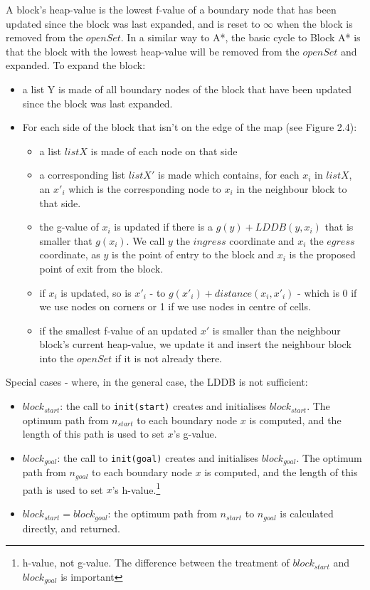 \documentclass[12pt,twoside,notitlepage]{report}
\begin{document}
\noindent
A block's heap-value is the lowest f-value of a boundary node that has been updated since the block was last expanded, and is reset to {$\infty$} when the block is removed from the {$openSet$}. In a similar way to A*, the basic cycle to Block A* is that the block with the lowest heap-value will be removed from the {$openSet$} and expanded. To expand the block:
\begin{itemize}
\item a list Y is made of all boundary nodes of the block that have been updated since the block was last expanded. 
\item For each side of the block that isn't on the edge of the map (see Figure 2.4):
  \begin{itemize}
  \item a list {$listX$} is made of each node on that side
  \item a corresponding list {$listX'$} is made which contains, for each {$x_{i}$} in {$listX$}, an {$x'_{i}$} which is the corresponding node to {$x_{i}$} in the neighbour block to that side.
  \item the g-value of {$x_{i}$} is updated if there is a {$g(y) + LDDB(y,x_{i})$} that is smaller that {$g(x_{i})$}. We call $y$ the $ingress$ coordinate and $x_{i}$ the $egress$ coordinate, as $y$ is the point of entry to the block and $x_{i}$ is the proposed point of exit from the block. 
  \item if {$x_{i}$} is updated, so is {$x'_{i}$} - to {$g(x'_{i})+ distance(x_{i},x'_{i})$} - which is 0 if we use nodes on corners or 1 if we use nodes in centre of cells.
  \item if the smallest f-value of an updated {$x'$} is smaller than the neighbour block's current heap-value, we update it and insert the neighbour block into the {$openSet$} if it is not already there.
  \end{itemize}
\end{itemize}
\noindent
Special cases - where, in the general case, the LDDB is not sufficient:
\begin{itemize} 
\item {\em $block_{start}$}: the call to {\tt init(start)} creates and initialises $block_{start}$. The optimum path from {$n_{start}$} to each boundary node {$x$} is computed, and the length of this path is used to set {$x$}'s g-value.
\item {\em $block_{goal}$}: the call to {\tt init(goal)} creates and initialises {$block_{goal}$}. The optimum path from $n_{goal}$ to each boundary node {$x$} is computed, and the length of this path is used to set {$x$}'s h-value.\footnote{h-value, not g-value. The difference between the treatment of $block_{start}$ and $block_{goal}$ is important}
\item{\em $block_{start} = block_{goal}$}: the optimum path from {$n_{start}$} to {$n_{goal}$} is calculated directly, and returned.
\end{itemize}
\end{document}
